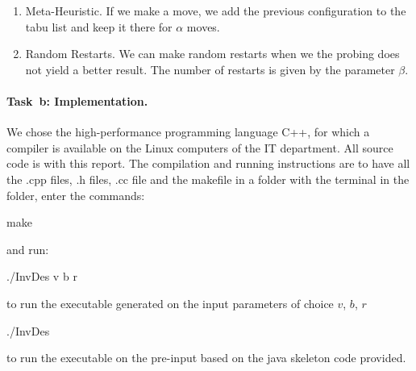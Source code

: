 \begin{enumerate}
\item Meta-Heuristic. If we make a move, we add the previous configuration to the tabu list and keep it there for $\alpha$ moves.  
\item Random Restarts. We can make random restarts when we the probing does not yield a better result. The number of restarts is given by the parameter $\beta$. 
\end{enumerate}

\paragraph{Task~b: Implementation.}
We chose the high-performance programming language C++, for
which a compiler is available on the Linux
computers of the IT department.  All source code is 
with this report.  The compilation and running instructions are
to have all the \textsf{.cpp} files, \textsf{.h} files, \textsf{.cc} file and the makefile in a folder with the terminal in the folder, enter the commands:
\begin{center}
\textsf{make}
\end{center}
and run:
\begin{center}
\textsf{./InvDes {v} {b} {r} }
\end{center}
to run the executable generated on the input parameters of choice $v$,  $b$,  $r$
\begin{center}
\textsf{./InvDes}
\end{center}
to run the executable on the pre-input based on the java skeleton code provided. 

